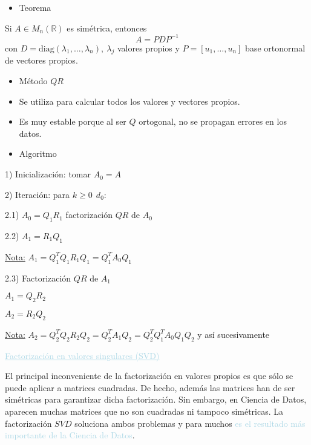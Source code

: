 \documentclass[12pt]{article}
\begin{document}
\begin{itemize}[label=\color{red}\textbullet, leftmargin=*]
    \item \color{lightblue}Teorema
\end{itemize}
Si $A\in M_n(\mathbb{R})$ es simétrica, entonces \[A=PDP^{-1}\] con $D=\mathrm{diag}(\lambda_1,\hdots,\lambda_n),~\lambda_j$ valores propios y $P=[u_1,\hdots,u_n]$ base ortonormal de vectores propios. 
\begin{itemize}[label=\color{red}\textbullet, leftmargin=*]
    \item \color{lightblue} Método $QR$
\end{itemize} 
\begin{itemize}[label=$\longrightarrow$]
\item Se utiliza para calcular todos los valores y vectores propios. 
\item Es muy estable porque al ser $Q$ ortogonal, no se propagan errores en los datos.
\end{itemize}
\begin{itemize}[label=\color{red}\textbullet, leftmargin=*]
    \item \color{lightblue} Algoritmo
\end{itemize}

1) Inicialización: tomar $A_0=A$

2) Iteración: para $k\ge0~~d_0$:

\hspace{1cm} 2.1) $A_0=Q_1R_1$ factorización $QR$ de $A_0$

\hspace{1cm} 2.2) $A_1=R_1Q_1$

\hspace{1cm}\underline{Nota:} $A_1=Q_1^TQ_1R_1Q_1=Q_1^TA_0Q_1$

\hspace{1cm}2.3) Factorización $QR$ de $A_1$

\hspace{1.5cm} $A_1=Q_2R_2$

\hspace{1cm} $A_2=R_2Q_2$

\hspace{1cm}\underline{Nota:} $A_2=Q_2^TQ_2R_2Q_2=Q_2^TA_1Q_2=Q_2^TQ_1^TA_0Q_1Q_2$ y así sucesivamente

\textcolor{lightblue}{\underline{Factorización en valores singulares (SVD)}}

El principal inconveniente de la factorización en valores propios es que sólo se puede aplicar a matrices cuadradas. De hecho, además las matrices han de ser simétricas para garantizar dicha factorización. Sin embargo, en Ciencia de Datos, aparecen muchas matrices que no son cuadradas ni tampoco simétricas. La factorización $SVD$ soluciona ambos problemas y para muchos \textcolor{lightblue}{es el resultado más importante de la Ciencia de Datos}.
\end{document}
